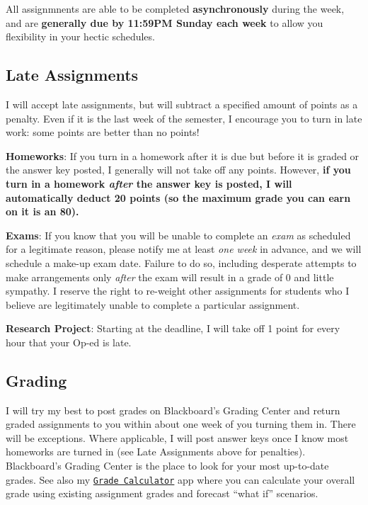 \documentclass{article}
\begin{document}
All assignmnents are able to be completed \textbf{asynchronously} during
the week, and are \textbf{generally due by 11:59PM Sunday each week} to
allow you flexibility in your hectic schedules.

\hypertarget{late-assignments}{%
\subsection*{Late Assignments}\label{late-assignments}}

I will accept late assignments, but will subtract a specified amount of
points as a penalty. Even if it is the last week of the semester, I
encourage you to turn in late work: some points are better than no
points!

\textbf{Homeworks}: If you turn in a homework after it is due but before
it is graded or the answer key posted, I generally will not take off any
points. However, \textbf{if you turn in a homework \emph{after} the
answer key is posted, I will automatically deduct 20 points (so the
maximum grade you can earn on it is an 80).}

\textbf{Exams}: If you know that you will be unable to complete an
\emph{exam} as scheduled for a legitimate reason, please notify me at
least \emph{one week} in advance, and we will schedule a make-up exam
date. Failure to do so, including desperate attempts to make
arrangements only \emph{after} the exam will result in a grade of 0 and
little sympathy. I reserve the right to re-weight other assignments for
students who I believe are legitimately unable to complete a particular
assignment.

\textbf{Research Project}: Starting at the deadline, I will take off 1
point for every hour that your Op-ed is late.

\hypertarget{grading}{%
\subsection*{Grading}\label{grading}}

I will try my best to post grades on Blackboard's Grading Center and
return graded assignments to you within about one week of you turning
them in. There will be exceptions. Where applicable, I will post answer
keys once I know most homeworks are turned in (see Late Assignments
above for penalties). Blackboard's Grading Center is the place to look
for your most up-to-date grades. See also my
\href{https://ryansafner.shinyapps.io/306_grade_calculator/}{
\texttt{Grade\ Calculator}} app where you can calculate your overall
grade using existing assignment grades and forecast ``what if''
scenarios.
\end{document}
